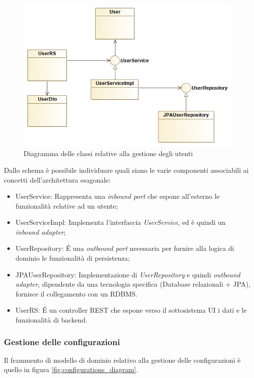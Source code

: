 \begin{figure}[h]
	\centering
	\includegraphics[width=\textwidth]{img/users_diagram}
	\caption{Diagramma delle classi relative alla gestione degli utenti}
	\label{fig:users_diagram}
\end{figure}

Dallo schema è possibile individuare quali siano le varie componenti associabili ai concetti dell'architettura esagonale:
\begin{itemize}
	\item UserService: Rappresenta una \textit{inbound port} che espone all'esterno le funzionalità relative ad un utente;
	\item UserServiceImpl: Implementa l'interfaccia \textit{UserService}, ed è quindi un \textit{inbound adapter};
	\item UserRepository: \'E una \textit{outbound port} necessaria per fornire alla logica di dominio le funzionalità di persistenza;
	\item JPAUserRepository: Implementazione di \textit{UserRepository} e quindi \textit{outbound adapter}, dipendente da una tecnologia specifica (Database relazionali + JPA), fornisce il collegamento con un RDBMS.
	\item UserRS: \'E un controller REST che espone verso il sottosistema UI i dati e le funzionalità di backend.
\end{itemize}

\subsubsection{Gestione delle configurazioni}
Il frammento di modello di dominio relativo alla gestione delle configurazioni è quello in figura \ref{fig:configurations_diagram}.

